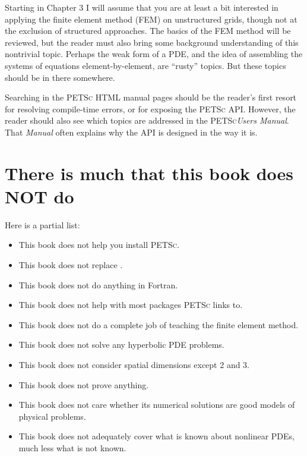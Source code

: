 \documentclass{tufte-book}
\theoremstyle{definition}
\newcommand{\PETSc}{\textsc{PETSc}\xspace}
\begin{document}
Starting in Chapter 3 I will assume that you are at least a bit interested in applying the finite element method (FEM) on unstructured grids, though not at the exclusion of structured approaches.  The basics of the FEM method will be reviewed, but the reader must also bring some background understanding of this nontrivial topic.  Perhaps the weak form of a PDE, and the idea of assembling the systems of equations element-by-element, are ``rusty'' topics.  But these topics should be in there somewhere.

Searching in the \PETSc HTML manual pages should be the reader's first resort for resolving compile-time errors, or for exposing the \PETSc API.  However, the reader should also see which topics are addressed in the \PETSc \emph{Users Manual}.  That \emph{Manual} often explains why the API is designed in the way it is.


\section{There is much that this book does NOT do}

Here is a partial list:\begin{itemize}
\item This book does not help you install \PETSc.
\item This book does not replace \citep{Smithetal1996}.
\item This book does not do anything in Fortran.
\item This book does not help with most packages \PETSc links to.
\item This book does not do a complete job of teaching the finite element method.
\item This book does not solve any hyperbolic PDE problems.
\item This book does not consider spatial dimensions except 2 and 3.
\item This book does not prove anything.
\item This book does not care whether its numerical solutions are good models of physical problems.
\item This book does not adequately cover what is known about nonlinear PDEs, much less what is not known.
\end{itemize}


\mainmatter


\end{document}

